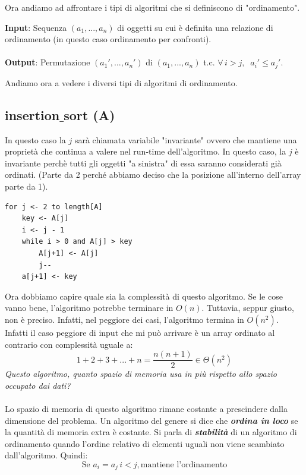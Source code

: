 \documentclass[a4paper]{article}
\begin{document}
Ora andiamo ad affrontare i tipi di algoritmi che si definiscono di "ordinamento".
\begin{definition}
\textbf{Input}: Sequenza $(a_1, ..., a_n)$ di oggetti su cui è definita una relazione di ordinamento (in questo caso ordinamento per confronti).
\\\\
\textbf{Output}: Permutazione $(a_1', ..., a_n')$ di $(a_1, ..., a_n)$ t.c. $\forall \, i > j, \; \; a_i' \le a_j'$.
\end{definition}
Andiamo ora a vedere i diversi tipi di algoritmi di ordinamento.

\subsection{insertion$\_$sort (A)}

In questo caso la $j$ sarà chiamata variabile "invariante" ovvero che mantiene una proprietà che continua a valere nel run-time dell'algoritmo. In questo caso, la $j$ è invariante perchè tutti gli oggetti "a sinistra" di essa saranno considerati già ordinati. (Parte da 2 perché abbiamo deciso che la posizione all'interno dell'array parte da 1).

\begin{lstlisting}
for j <- 2 to length[A]
    key <- A[j]
    i <- j - 1
    while i > 0 and A[j] > key
        A[j+1] <- A[j]
        j--
    a[j+1] <- key
\end{lstlisting}
Ora dobbiamo capire quale sia la complessità di questo algoritmo. Se le cose vanno bene, l'algoritmo potrebbe terminare in $O(n)$. Tuttavia, seppur giusto, non è preciso. Infatti, nel peggiore dei casi, l'algoritmo termina in $O(n^2)$. Infatti il caso peggiore di input che mi può arrivare è un array ordinato al contrario con complessità uguale a:
\[1 + 2 + 3 + ... + n = \frac{n(n+1)}{2} \in \Theta(n^2)\]
\textit{Questo algoritmo, quanto spazio di memoria usa in più rispetto allo spazio occupato dai dati? }
\\\\
Lo spazio di memoria di questo algoritmo rimane costante a prescindere dalla dimensione del problema. Un algoritmo del genere si dice che \textit{\textbf{ordina in loco}} se la quantità di memoria extra è costante. Si parla di \textit{\textbf{stabilità}} di un algoritmo di ordinamento quando l'ordine relativo di elementi uguali non viene scambiato dall'algoritmo. Quindi:
\[\text{Se } a_i = a_j \, i < j, \text{mantiene l'ordinamento}\]
\end{document}
